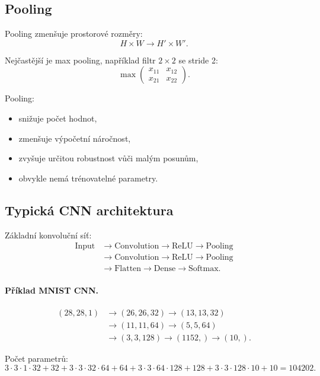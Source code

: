 \subsection{Pooling}

Pooling zmenšuje prostorové rozměry:
\[
H\times W \rightarrow H'\times W'.
\]

Nejčastější je max pooling, například filtr $2\times 2$ se stride 2:
\[
\max
\begin{pmatrix}
x_{11} & x_{12}\\
x_{21} & x_{22}
\end{pmatrix}.
\]

Pooling:
\begin{itemize}
    \item snižuje počet hodnot,
    \item zmenšuje výpočetní náročnost,
    \item zvyšuje určitou robustnost vůči malým posunům,
    \item obvykle nemá trénovatelné parametry.
\end{itemize}

\subsection{Typická CNN architektura}

Základní konvoluční síť:
\begin{align*}
\text{Input}
&\rightarrow
\text{Convolution}
\rightarrow
\text{ReLU}
\rightarrow
\text{Pooling}\\
&\rightarrow
\text{Convolution}
\rightarrow
\text{ReLU}
\rightarrow
\text{Pooling}\\
&\rightarrow
\text{Flatten}
\rightarrow
\text{Dense}
\rightarrow
\text{Softmax}.
\end{align*}

\paragraph{Příklad MNIST CNN.}
\begin{align*}
(28,28,1)
&\rightarrow
(26,26,32)
\rightarrow
(13,13,32)\\
&\rightarrow
(11,11,64)
\rightarrow
(5,5,64)\\
&\rightarrow
(3,3,128)
\rightarrow
(1152,)
\rightarrow
(10,).
\end{align*}

Počet parametrů:
\[
3\cdot3\cdot1\cdot32+32
+
3\cdot3\cdot32\cdot64+64
+
3\cdot3\cdot64\cdot128+128
+
3\cdot3\cdot128\cdot10+10
=
104202.
\]

